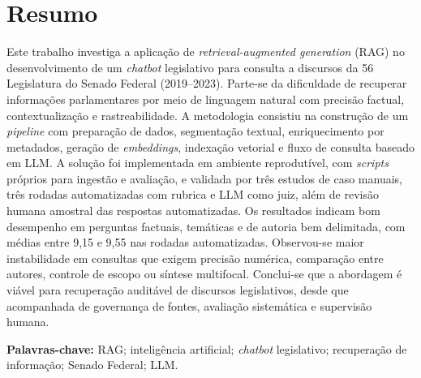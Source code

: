 \section*{\centering Resumo}

Este trabalho investiga a aplicação de \textit{retrieval-augmented generation} (RAG) no desenvolvimento de um \textit{chatbot} legislativo para consulta a discursos da 56\textordfeminine{} Legislatura do Senado Federal (2019--2023). Parte-se da dificuldade de recuperar informações parlamentares por meio de linguagem natural com precisão factual, contextualização e rastreabilidade. A metodologia consistiu na construção de um \textit{pipeline} com preparação de dados, segmentação textual, enriquecimento por metadados, geração de \textit{embeddings}, indexação vetorial e fluxo de consulta baseado em LLM. A solução foi implementada em ambiente reprodutível, com \textit{scripts} próprios para ingestão e avaliação, e validada por três estudos de caso manuais, três rodadas automatizadas com rubrica e LLM como juiz, além de revisão humana amostral das respostas automatizadas. Os resultados indicam bom desempenho em perguntas factuais, temáticas e de autoria bem delimitada, com médias entre 9,15 e 9,55 nas rodadas automatizadas. Observou-se maior instabilidade em consultas que exigem precisão numérica, comparação entre autores, controle de escopo ou síntese multifocal. Conclui-se que a abordagem é viável para recuperação auditável de discursos legislativos, desde que acompanhada de governança de fontes, avaliação sistemática e supervisão humana.

\textbf{Palavras-chave:} RAG; inteligência artificial; \textit{chatbot} legislativo; recuperação de informação; Senado Federal; LLM.
